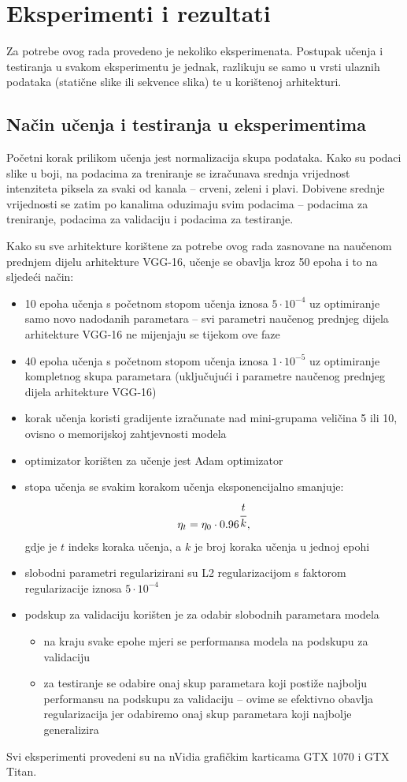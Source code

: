 \documentclass[times, utf8, diplomski, numeric]{fer}
\begin{document}
\chapter{Eksperimenti i rezultati}
Za potrebe ovog rada provedeno je nekoliko eksperimenata. 
Postupak učenja i testiranja u svakom eksperimentu je jednak, razlikuju se samo u vrsti ulaznih podataka (statične slike ili sekvence slika) te u korištenoj arhitekturi.

\section{Način učenja i testiranja u eksperimentima}
Početni korak prilikom učenja jest normalizacija skupa podataka.
Kako su podaci slike u boji, na podacima za treniranje se izračunava srednja vrijednost intenziteta piksela za svaki od kanala -- crveni, zeleni i plavi.
Dobivene srednje vrijednosti se zatim po kanalima oduzimaju svim podacima -- podacima za treniranje, podacima za validaciju i podacima za testiranje.

Kako su sve arhitekture korištene za potrebe ovog rada zasnovane na naučenom prednjem dijelu arhitekture VGG-16, učenje se obavlja kroz 50 epoha i to na sljedeći način:
\begin{itemize}
 \item 10 epoha učenja s početnom stopom učenja iznosa $5\cdot10^{-4}$ uz optimiranje samo novo nadodanih parametara -- svi parametri naučenog prednjeg dijela arhitekture VGG-16 ne mijenjaju se tijekom ove faze
 \item 40 epoha učenja s početnom stopom učenja iznosa $1\cdot10^{-5}$ uz optimiranje kompletnog skupa parametara (uključujući i parametre naučenog prednjeg dijela arhitekture VGG-16)
 \item korak učenja koristi gradijente izračunate nad mini-grupama veličina 5 ili 10, ovisno o memorijskoj zahtjevnosti modela
 \item optimizator korišten za učenje jest Adam optimizator
 \item stopa učenja se svakim korakom učenja eksponencijalno smanjuje:
 \begin{align}
  \eta_{t}=\eta_0 \cdot 0.96^{\cfrac{t}{k}},
 \end{align}
gdje je $t$ indeks koraka učenja, a $k$ je broj koraka učenja u jednoj epohi
 \item slobodni parametri regularizirani su L2 regularizacijom s faktorom regularizacije iznosa $5\cdot10^{-4}$
 \item podskup za validaciju korišten je za odabir slobodnih parametara modela
 \begin{itemize}
  \item na kraju svake epohe mjeri se performansa modela na podskupu za validaciju
  \item za testiranje se odabire onaj skup parametara koji postiže najbolju performansu na podskupu za validaciju -- ovime se efektivno obavlja regularizacija jer odabiremo onaj skup parametara koji najbolje generalizira
 \end{itemize}
\end{itemize}
Svi eksperimenti provedeni su na nVidia grafičkim karticama GTX 1070 i GTX Titan.
\end{document}
